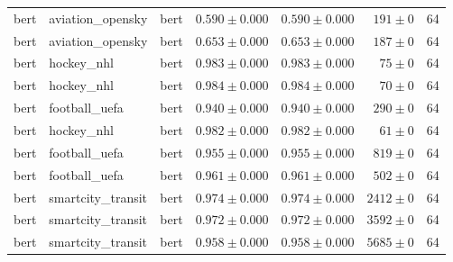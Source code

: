 \begin{table}[htbp]
\begin{tabular}{l l l r r r r}
bert & aviation\_opensky & bert & $0.590\pm0.000$ & $0.590\pm0.000$ & $191\pm0$ & 64 \\
bert & aviation\_opensky & bert & $0.653\pm0.000$ & $0.653\pm0.000$ & $187\pm0$ & 64 \\
bert & hockey\_nhl & bert & $0.983\pm0.000$ & $0.983\pm0.000$ & $75\pm0$ & 64 \\
bert & hockey\_nhl & bert & $0.984\pm0.000$ & $0.984\pm0.000$ & $70\pm0$ & 64 \\
bert & football\_uefa & bert & $0.940\pm0.000$ & $0.940\pm0.000$ & $290\pm0$ & 64 \\
bert & hockey\_nhl & bert & $0.982\pm0.000$ & $0.982\pm0.000$ & $61\pm0$ & 64 \\
bert & football\_uefa & bert & $0.955\pm0.000$ & $0.955\pm0.000$ & $819\pm0$ & 64 \\
bert & football\_uefa & bert & $0.961\pm0.000$ & $0.961\pm0.000$ & $502\pm0$ & 64 \\
bert & smartcity\_transit & bert & $0.974\pm0.000$ & $0.974\pm0.000$ & $2412\pm0$ & 64 \\
bert & smartcity\_transit & bert & $0.972\pm0.000$ & $0.972\pm0.000$ & $3592\pm0$ & 64 \\
bert & smartcity\_transit & bert & $0.958\pm0.000$ & $0.958\pm0.000$ & $5685\pm0$ & 64 \\
\hline
\end{tabular}
\end{table}
